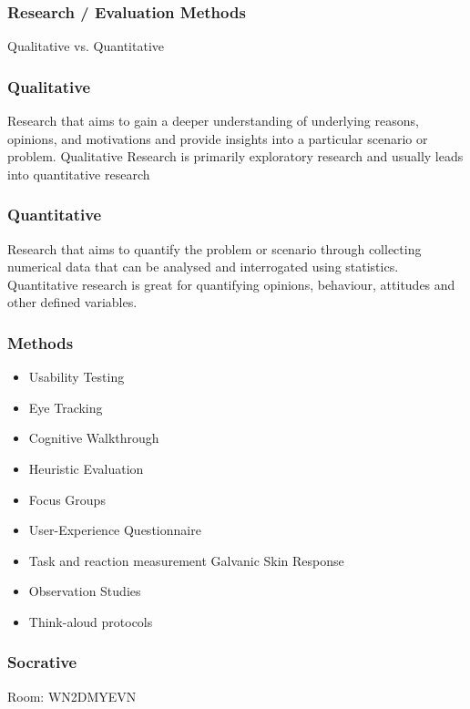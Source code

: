 \begin{frame}
	\frametitle{Research / Evaluation Methods}
	
	\huge Qualitative vs. Quantitative 
\end{frame}

\begin{frame}
	\frametitle{Qualitative}
	Research that aims to gain a deeper understanding of underlying reasons, opinions, and motivations and provide insights into a particular scenario or problem.  Qualitative Research is primarily exploratory research and usually leads into quantitative research 
	\end{frame}

\begin{frame}
	\frametitle{Quantitative}
	Research that aims to quantify the problem or scenario through collecting numerical data that can be analysed and interrogated using statistics. Quantitative research is great for quantifying opinions, behaviour, attitudes and other defined variables.
	\end{frame}	

\begin{frame}
	\frametitle{Methods}
	\begin{itemize}
		\item Usability Testing
		\item Eye Tracking
		\item Cognitive Walkthrough
		\item Heuristic Evaluation
		\item Focus Groups
		\item User-Experience Questionnaire
		\item Task and reaction measurement Galvanic Skin Response
		\item Observation Studies
		\item Think-aloud protocols
	\end{itemize}
\end{frame}

\begin{frame}
	\frametitle{Socrative}
	Room: WN2DMYEVN
\end{frame}

